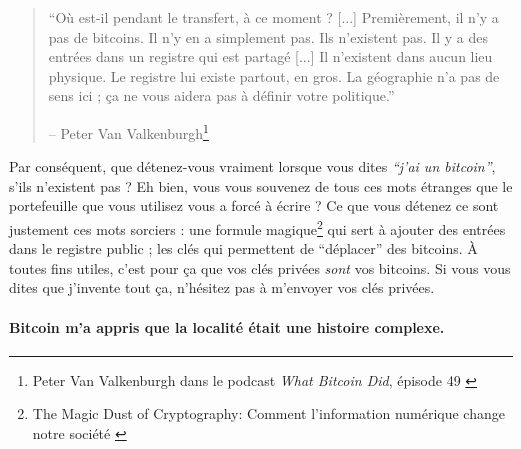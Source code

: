\begin{quotation}\begin{samepage}
\enquote{Où est-il pendant le transfert, à ce moment ? [...] Premièrement, il
n'y a pas de bitcoins. Il n'y en a simplement pas. Ils n'existent pas. Il y a
des entrées dans un registre qui est partagé [...] Il n'existent dans aucun
lieu physique. Le registre lui existe partout, en gros. La géographie n'a pas de
sens ici ; ça ne vous aidera pas à définir votre politique.}
\begin{flushright} -- Peter Van Valkenburgh\footnote{Peter Van Valkenburgh dans
le podcast \textit{What Bitcoin Did}, épisode 49 \cite{wbd049}}
\end{flushright}\end{samepage}\end{quotation}

Par conséquent, que détenez-vous vraiment lorsque vous dites
\textit{\enquote{j'ai un bitcoin}}, s'ils n'existent pas ? Eh bien, vous vous
souvenez de tous ces mots étranges que le portefeuille que vous utilisez vous a
forcé à écrire ? Ce que vous détenez ce sont justement ces mots sorciers : une
formule magique\footnote{The Magic Dust of Cryptography: Comment l'information
numérique change notre société \cite{gigi:magic-spell}} qui sert à ajouter des
entrées dans le registre public ; les clés qui permettent de \enquote{déplacer}
des bitcoins. À toutes fins utiles, c'est pour ça que vos clés privées
\textit{sont} vos bitcoins. Si vous vous dites que j'invente tout ça, n'hésitez
pas à m'envoyer vos clés privées.

\paragraph{Bitcoin m'a appris que la localité était une histoire complexe.}

%
%
%
%
%
%
%
